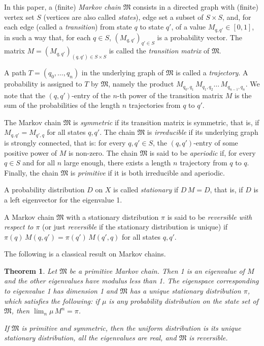 \documentclass{article}
\def\tM{\mathfrak{M}}
\theoremstyle{plain}
\newtheorem{theorem}{Theorem}
\theoremstyle{definition}
\begin{document}
In this paper, a (finite) \emph{Markov chain} $\tM$ consists in a directed graph with (finite) vertex set $S$ (vertices are also called \emph{states}), edge set a subset of $S\times S$, and, for each edge (called a \emph{transition}) from state $q$ to state $q'$, of a value $M_{q,q'} \in [0,1]$, in such a way that, for each $q\in S$, $(M_{q,q'})_{q'\in S}$ is a probability vector. The matrix $M = (M_{q,q'})_{(q,q') \in S \times S}$ is called the \emph{transition matrix} of $\tM$.

A path $T = (q_0,\dots,q_n)$ in the underlying graph of $\tM$ is called a \emph{trajectory}. A probability is assigned to $T$ by $\tM$, namely the product $M_{q_0,q_1}\,M_{q_1,q_2}\dots\,M_{q_{n-1},q_n}$. We note that the $(q,q')$-entry of the $n$-th power of the transition matrix $M$ is the sum of the probabilities of the length $n$ trajectories from $q$ to $q'$.

The Markov chain $\tM$ is \emph{symmetric} if its transition matrix is symmetric, that is, if $M_{q,q'} = M_{q',q}$ for all states $q,q'$. The chain $\tM$ is \emph{irreducible} if its underlying graph is strongly connected, that is: for every $q, q'\in S$, the $(q,q')$-entry of some positive power of $M$ is non-zero. The chain $\tM$ is said to be \emph{aperiodic} if, for every $q \in S$ and for all $n$ large enough, there exists a length $n$ trajectory from $q$ to $q$. Finally, the chain $\tM$ is \emph{primitive} if it is both irreducible and aperiodic.

A probability distribution $D$ on $X$ is called \emph{stationary} if $D\,M = D$, that is, if $D$ is a left eigenvector for the eigenvalue 1.

A Markov chain $\tM$ with a stationary distribution $\pi$ is said to be \emph{reversible with respect to $\pi$} (or just \emph{reversible} if the stationary distribution is unique) if $\pi(q)\,M(q,q') = \pi(q')\,M(q',q)$ for all states $q,q'$.

The following is a classical result on Markov chains.

\begin{theorem}\label{thm: basics on Markov}
    Let $\tM$ be a primitive Markov chain. Then 1 is an eigenvalue of $M$ and the other eigenvalues have modulus less than 1. The eigenspace corresponding to eigenvalue 1 has dimension 1 and $\tM$ has a unique stationary distribution $\pi$, which satisfies the following: if $\mu$ is any probability distribution on the state set of $\tM$, then $\lim_n \mu\,M^n = \pi$. 

    If $\tM$ is primitive and symmetric, then the uniform distribution is its unique stationary distribution, all the eigenvalues are real, and $\tM$ is reversible.
\end{theorem}
\end{document}
